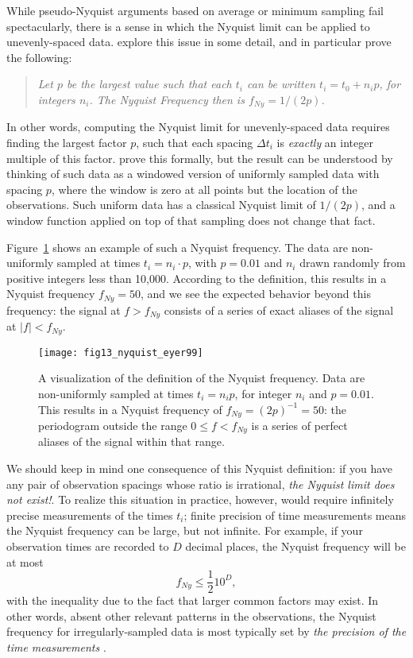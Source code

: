 \documentclass[preprint]{aastex}
\newcommand{\Fig}[1]{Figure~\ref{fig:#1}}
\newcommand{\figlabel}[1]{\label{fig:#1}}
\newcommand{\eqlabel}[1]{\label{eq:#1}}
\begin{document}
While pseudo-Nyquist arguments based on average or minimum sampling
fail spectacularly, there is a sense in which the Nyquist limit can
be applied to unevenly-spaced data. \citet{Eyer99} explore this issue
in some detail, and in particular prove the following:
\begin{quote}
{\it Let $p$ be the largest value such that each $t_i$ can be written
  $t_i = t_0 + n_i p$, for integers $n_i$. The Nyquist Frequency then
  is $f_{Ny} = 1 / (2p)$.}
\end{quote}
In other words, computing the Nyquist limit for unevenly-spaced data requires
finding the largest factor $p$, such that each spacing $\Delta t_i$ is
{\it exactly} an integer multiple of this factor.
\citet{Eyer99} prove this formally, but the result can be understood
by thinking of such data as a windowed version of uniformly sampled
data with spacing $p$, where the window is zero at all points but the
location of the observations.
Such uniform data has a classical Nyquist limit of $1/(2p)$, and a window
function applied on top of that sampling does not change that fact.

\Fig{nyquist-eyer99} shows an example of such a Nyquist frequency.
The data are non-uniformly sampled at times $t_i = n_i \cdot p$, with $p=0.01$
and $n_i$ drawn randomly from positive integers less than 10,000.
According to the \citet{Eyer99} definition,
this results in a Nyquist frequency $f_{Ny} = 50$, and we see the expected
behavior beyond this frequency: the signal at $f > f_{Ny}$ consists of a series
of exact aliases of the signal at $|f| < f_{Ny}$.

\begin{figure}[ht]
  \centering
  \texttt{[image: fig13\_nyquist\_eyer99]}
  \caption{A visualization of the \citet{Eyer99} definition of the Nyquist
    frequency. Data are non-uniformly sampled at times $t_i = n_i p$, for
    integer $n_i$ and $p=0.01$.
    This results in a Nyquist frequency of $f_{Ny}= (2p)^{-1} = 50$:
    the periodogram outside the range $0 \le f < f_{Ny}$ is a series of
    perfect aliases of the signal within that range.
    \figlabel{nyquist-eyer99}}
\end{figure}

We should keep in mind one consequence of this Nyquist definition:
if you have any pair of observation spacings
whose ratio is irrational, {\it the Nyquist limit does not exist!}.
To realize this situation in practice, however,
would require infinitely precise measurements of the
times $t_i$; finite precision of time measurements means the Nyquist
frequency can be large, but not infinite.
For example, if your observation times are recorded to $D$ decimal places,
the Nyquist frequency will be at most
\begin{equation}
  f_{Ny} \le \frac{1}{2} 10^D,
  \eqlabel{nonuniform-nyquist}
\end{equation}
with the inequality due to the fact that larger common factors may exist.
In other words, absent other relevant patterns in the observations,
the Nyquist frequency for irregularly-sampled data is most
typically set by {\it the precision of the time measurements}
\citep[see also][for more rigorous treatments
  of this result]{Bretthorst2003, Koen2006}.
\end{document}
